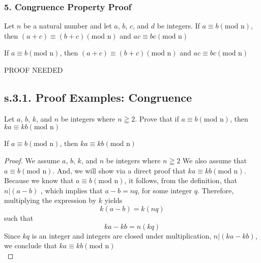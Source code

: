 \subsubsection*{5. Congruence Property Proof} 
Let $n$ be a natural number and let $a$, $b$, $c$, and $d$ be integers. If $a \equiv b (\text{mod n})$, then $(a + c) \equiv (b + c) (\text{mod n})$ and $ac \equiv bc (\text{mod n})$ \\

\begin{tcolorbox}
	\begin{theorem}
		If $a \equiv b (\text{mod n})$, then $(a + c) \equiv (b + c) (\text{mod n})$ and $ac \equiv bc (\text{mod n})$
	\end{theorem}
\end{tcolorbox}

PROOF NEEDED









\newpage
\subsection{s.3.1. Proof Examples: Congruence}


\begin{example}
Let $a$, $b$, $k$, and $n$ be integers where $n \geqq 2$. Prove that if $a \equiv b (\text{mod n})$, then $ka \equiv kb (\text{mod n})$

\begin{tcolorbox}
	\begin{theorem}
		If $a \equiv b (\text{mod n})$, then $ka \equiv kb (\text{mod n})$
	\end{theorem}
\end{tcolorbox}

\begin{proof}
We assume $a$, $b$, $k$, and $n$ be integers where $n \geqq 2$ We also assume that $a \equiv b (\text{mod n})$. And, we will show via a direct proof that $ka \equiv kb (\text{mod n})$. Because we know that $a \equiv b (\text{mod n})$, it follows, from the definition, that   $n | (a-b)$ , which implies that $a-b = nq$, for some integer $q$. Therefore, multiplying the expression by $k$ yields \[ k(a-b) = k(nq) \] such that \[ka - kb = n(kq) \]
Since $kq$ is an integer and integers are closed under multiplication, $n | (ka - kb)$, we conclude that $ka \equiv kb (\text{mod n})$ \\
\end{proof}
\end{example}




